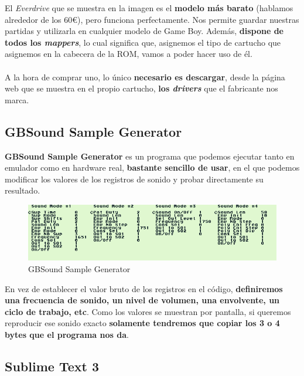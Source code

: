 El \textit{Everdrive} que se muestra en la imagen es el \textbf{modelo más barato} (hablamos alrededor de los 60€), pero funciona perfectamente. Nos permite guardar nuestras partidas y utilizarla en cualquier modelo de Game Boy. Además, \textbf{dispone de todos los \textit{mappers}}, lo cual significa que, asignemos el tipo de cartucho que asignemos en la cabecera de la ROM, vamos a poder hacer uso de él.
\\ \\ 
A la hora de comprar uno, lo único \textbf{necesario es descargar}, desde la página web que se muestra en el propio cartucho, \textbf{los \textit{drivers}} que el fabricante nos marca. 

\subsection{GBSound Sample Generator}
\label{GBSound}
\textbf{GBSound Sample Generator} es un programa que podemos ejecutar tanto en emulador como en hardware real, \textbf{bastante sencillo de usar}, en el que podemos modificar los valores de los registros de sonido y probar directamente su resultado.

\begin{figure}[h]
\centering
\includegraphics[width=1\textwidth]{include/images/manual/gbsound.png}
\caption{GBSound Sample Generator}
\label{figure:gbsound}
\end{figure}

En vez de establecer el valor bruto de los registros en el código, \textbf{definiremos una frecuencia de sonido, un nivel de volumen, una envolvente, un ciclo de trabajo, etc}. Como los valores se muestran por pantalla, si queremos reproducir ese sonido exacto \textbf{solamente tendremos que copiar los 3 o 4 bytes que el programa nos da}.

\clearpage

\subsection{Sublime Text 3}

